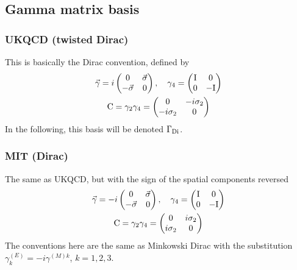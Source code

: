 \documentclass[12pt]{article}
\newcommand{\dirac}{{\rm Di}}
\begin{document}

\subsection{Gamma matrix basis}
\subsubsection{UKQCD (twisted Dirac)}
This is basically the Dirac convention, defined by
\begin{gather*}
\vec{\gamma} = i \begin{pmatrix}0 & \vec{\sigma}\\ -\vec{\sigma} & 0 \end{pmatrix},\quad
\gamma_4 = \begin{pmatrix} {\rm I} & 0\\ 0 & -{\rm I} \end{pmatrix} \\
{\rm C} = \gamma_2\gamma_4 = \begin{pmatrix} 0 & -i\sigma_2\\ -i\sigma_2 & 0 \end{pmatrix}
\end{gather*}
In the following, this basis will be denoted $\Gamma_\dirac$.

\subsubsection{MIT (Dirac)}
The same as UKQCD, but with the sign of the spatial components reversed
\begin{gather*}
\vec{\gamma} = -i\begin{pmatrix} 0 & \vec{\sigma}\\ -\vec{\sigma} & 0 \end{pmatrix},\quad
\gamma_4 = \begin{pmatrix} {\rm I} & 0\\ 0 & -{\rm I} \end{pmatrix} \\
{\rm C} = \gamma_2\gamma_4 = \begin{pmatrix} 0 & i\sigma_2\\ i\sigma_2 & 0\end{pmatrix}
\end{gather*}
The conventions here are the same as Minkowski Dirac with the substitution
$\gamma_k^{(E)} = -i\gamma^{(M) k}$, $k=1,2,3$.
\end{document}
